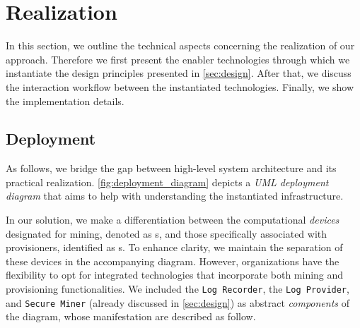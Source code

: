 \section{Realization}
\label{sec:realization}
In this section, we outline the technical aspects concerning the realization of our approach. Therefore we first present the enabler technologies through which we instantiate the design principles presented in \cref{sec:design}. After that, we discuss the interaction workflow between the instantiated technologies. Finally, we show the implementation details.

\subsection{Deployment}
As follows, we bridge the gap between high-level system architecture and its practical realization. \cref{fig:deployment_diagram} depicts a \textit{UML deployment diagram} \cite{koch2002expressive} that aims to help with understanding the instantiated infrastructure. 

In our solution, we make a differentiation between the computational \textit{devices} designated for mining, denoted as s, and those specifically associated with provisioners, identified as s. To enhance clarity, we maintain the separation of these devices in the accompanying diagram. However, organizations have the flexibility to opt for integrated technologies that incorporate both mining and provisioning functionalities. %
We included the \texttt{Log Recorder}, the \texttt{Log Provider}, and \texttt{Secure Miner} (already discussed in \cref{sec:design}) as abstract \textit{components} of the diagram, whose manifestation are described as follow. 

